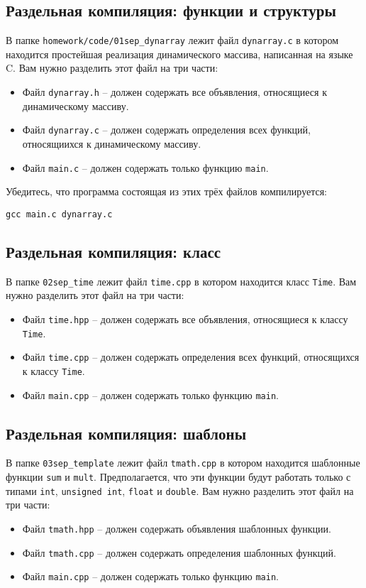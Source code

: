 \documentclass{article}
\begin{document}
\subsection{Раздельная компиляция: функции и структуры}
В папке \texttt{homework/code/01sep\_dynarray} лежит файл \texttt{dynarray.c} в котором находится простейшая реализация динамического массива, написанная на языке C. Вам нужно разделить этот файл на три части:
\begin{itemize}
\item Файл \texttt{dynarray.h} -- должен содержать все объявления, относящиеся к динамическому массиву.
\item Файл \texttt{dynarray.c} -- должен содержать определения всех функций, относящиихся к динамическому массиву.
\item Файл \texttt{main.c} -- должен содержать только функцию \texttt{main}.
\end{itemize}
Убедитесь, что программа состоящая из этих трёх файлов компилируется:
\begin{lstlisting}[style=csMiptBash]
gcc main.c dynarray.c
\end{lstlisting}


\subsection{Раздельная компиляция: класс}
В папке \texttt{02sep\_time} лежит файл \texttt{time.cpp} в котором находится класс \texttt{Time}. Вам нужно разделить этот файл на три части:
\begin{itemize}
\item Файл \texttt{time.hpp} -- должен содержать все объявления, относящиеся к классу \texttt{Time}.
\item Файл \texttt{time.cpp} -- должен содержать определения всех функций, относящихся к классу \texttt{Time}.
\item Файл \texttt{main.cpp} -- должен содержать только функцию \texttt{main}.
\end{itemize}
\subsection{Раздельная компиляция: шаблоны}
В папке \texttt{03sep\_template} лежит файл \texttt{tmath.cpp} в котором находится шаблонные функции \texttt{sum} и \texttt{mult}. Предполагается, что эти функции будут работать только с типами \texttt{int}, \texttt{unsigned int}, \texttt{float} и \texttt{double}. Вам нужно разделить этот файл на три части:
\begin{itemize}
\item Файл \texttt{tmath.hpp} -- должен содержать объявления шаблонных функции.
\item Файл \texttt{tmath.cpp} -- должен содержать определения шаблонных функций.
\item Файл \texttt{main.cpp} -- должен содержать только функцию \texttt{main}.
\end{itemize}
\end{document}
